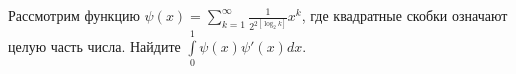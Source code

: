 \documentclass{article}
\begin{document}
Рассмотрим функцию $\psi(x) = \sum\limits_{k=1}^\infty \frac{1}{2^{2[\log_2 k]}} x^k$, где квадратные скобки означают 
целую часть числа. Найдите $\int\limits_0^1 \psi(x) \psi'(x) dx$.
\end{document}
